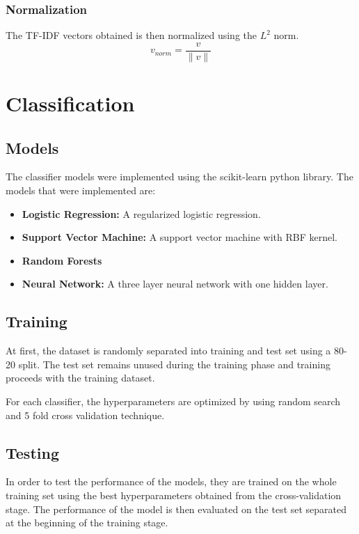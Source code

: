 \subsubsection{Normalization}
The TF-IDF vectors obtained is then normalized using the $L^2$ norm.
\begin{equation}
    v_{norm} = \frac{v}{\lVert v \rVert}
\end{equation}

\section{Classification}
\subsection{Models}
The classifier models were implemented using the scikit-learn python library. The models that were implemented are:
\begin{itemize}
    \item \textbf{Logistic Regression:} A regularized logistic regression.
    \item \textbf{Support Vector Machine:} A support vector machine with RBF kernel.
    \item \textbf{Random Forests}
    \item \textbf{Neural Network:} A three layer neural network with one hidden layer.
\end{itemize}

\subsection{Training}
At first, the dataset is randomly separated into training and test set using a 80-20 split. The test set remains unused during the training phase and training proceeds with the training dataset.

For each classifier, the hyperparameters are optimized by using random search and 5 fold cross validation technique.

\subsection{Testing}
In order to test the performance of the models, they are trained on the whole training set using the best hyperparameters obtained from the cross-validation stage. The performance of the model is then evaluated on the test set separated at the beginning of the training stage.